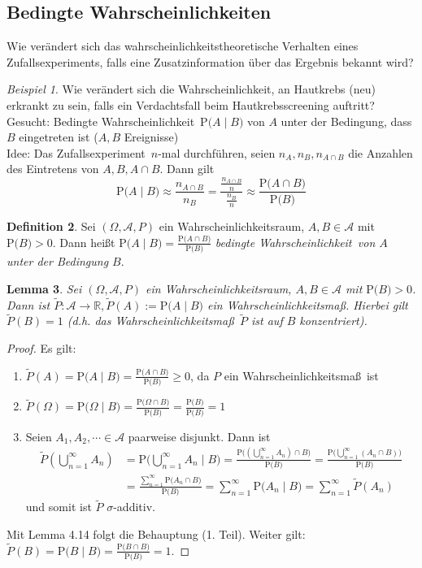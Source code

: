 \documentclass[a4paper,12pt,fleqn]{scrartcl}
\newcommand{\R}{\mathbb{R}}
\newcommand{\m}[1]{\mathcal{ #1 }}
\newcommand{\p}[1]{\text{P(} #1 \text{)}}
\newcommand{\ZE}{Zufallsexperiment}
\newcommand{\WR}{Wahrscheinlichkeitsraum}
\newcommand{\WM}{Wahrscheinlichkeitsmaß}
\newcommand{\Wk}{Wahrscheinlichkeit}
\theoremstyle{definition}
\newtheorem{definition}{Definition}[section]
\theoremstyle{plain}
\newtheorem{lemma}[definition]{Lemma}
\theoremstyle{remark}
\newtheorem{beispiel}[definition]{Beispiel}
\begin{document}
\subsection{Bedingte Wahrscheinlichkeiten}
Wie verändert sich das wahrscheinlichkeitstheoretische Verhalten eines \ZE s, falls eine Zusatzinformation über das Ergebnis bekannt wird?
\begin{beispiel}
Wie verändert sich die \Wk, an Hautkrebs (neu) erkrankt zu sein, falls ein Verdachtsfall beim Hautkrebsscreening auftritt? \\
Gesucht: Bedingte \Wk \, $\p{A \mid B}$ von $A$ unter der Bedingung, dass $B$ eingetreten ist ($A, B$ Ereignisse)\\
Idee: Das \ZE \, $n$-mal durchführen, seien $n_A, n_B, n_{A \cap B}$ die Anzahlen des Eintretens von $A, B, A \cap B$. Dann gilt
\[\p{A \mid B} \approx \frac{n_{A \cap B}}{n_B} = \frac{\frac{n_{A \cap B}}{n}}{\frac{n_B}{n}} \approx \frac{\p{A \cap B}}{\p{B}}\]
\end{beispiel}
\begin{definition}
Sei $(\Omega, \m{A}, P)$ ein \WR, $A,B \in \m{A}$ mit $\p{B} > 0$. Dann heißt $\p{A \mid B} = \frac{\p{A \cap B}}{\p{B}}$ \emph{bedingte \Wk \, von $A$ unter der Bedingung $B$}.
\end{definition}
\begin{lemma}
Sei $(\Omega, \m{A}, P)$ ein \WR, $A,B \in \m{A}$ mit $\p{B} > 0$. Dann ist $\tilde{P}: \m{A} \rightarrow \R, \tilde{P}(A) := \p{A \mid B}$ ein \WM. Hierbei gilt $\tilde{P}(B)=1$ (d.h. das \WM \, $\tilde{P}$ ist auf $B$ konzentriert).
\end{lemma}
\begin{proof}
Es gilt:
\begin{enumerate}[(1)]
\item $\tilde{P}(A) = \p{A \mid B} = \frac{\p{A \cap B}}{\p{B}} \geq 0$, da $P$ ein \WM \, ist
\item $\tilde{P}(\Omega) = \p{\Omega \mid B} = \frac{\p{\Omega \cap B}}{\p{B}} = \frac{\p{B}}{\p{B}} = 1$
\item Seien $A_1, A_2, \cdots \in \m{A}$ paarweise disjunkt. Dann ist
\begin{align*}
\tilde{P}(\bigcup_{n=1}^\infty A_n) &= \p{\bigcup_{n=1}^\infty A_n \mid B} = \frac{\p{(\bigcup_{n=1}^\infty A_n) \cap B}}{\p{B}} = \frac{\p{\bigcup_{n=1}^\infty (A_n \cap B)}}{\p{B}} \\
&= \frac{\sum_{n=1}^\infty \p{A_n \cap B}}{\p{B}} = \sum_{n=1}^\infty \p{A_n \mid B} = \sum_{n=1}^\infty \tilde{P}(A_n)
\end{align*}
und somit ist $\tilde{P}$ $\sigma$-additiv.
\end{enumerate}
Mit Lemma 4.14 folgt die Behauptung (1. Teil). Weiter gilt: $\tilde{P}(B) = \p{B \mid B} = \frac{\p{B \cap B}}{\p{B}} = 1$.
\end{proof}
\end{document}
